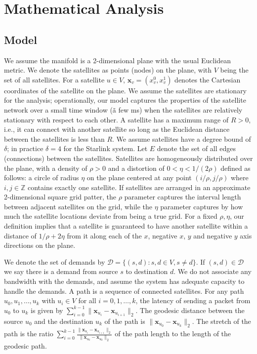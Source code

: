 \documentclass[acmsmall, screen]{acmart}
\begin{document}
\section{Mathematical Analysis}\label{appendix:analysis}
\subsection{Model}
We assume the manifold is a 2-dimensional plane with the usual Euclidean metric. 
We denote the satellites as points (nodes) on the plane, with $V$ being the set of all satellites. 
For a satellite $u \in V$, $\mathbf{x}_v = (x_v^0, x_v^1)$ denotes the Cartesian coordinates of the satellite on the plane. 
We assume the satellites are stationary for the analysis; operationally, our model captures the properties of the satellite network over a small time window (\~ a few ms) when the satellites are relatively stationary with respect to each other. 
A satellite has a maximum range of $R > 0$, i.e., it can connect with another satellite so long as the Euclidean distance between the satellites is less than $R$. 
We assume satellites have a degree bound of $\delta$; in practice $\delta = 4$ for the Starlink system. 
Let $E$ denote the set of all edges (connections) between the satellites. 
Satellites are homogeneously distributed over the plane, with a density of $\rho > 0$ and a distortion of $0 < \eta < 1/(2\rho)$ defined as follows:  
a circle of radius $\eta$ on the plane centered at any point $(i/\rho, j/\rho)$ where $i, j \in \mathbb{Z}$ contains exactly one satellite. 
If satellites are arranged in an approximate 2-dimensional square grid patter, the $\rho$ parameter captures the interval length between adjacent satellites on the grid, while the $\eta$ parameter captures by how much the satellite locations deviate from being a true grid. 
For a fixed $\rho, \eta$, our definition implies that a satellite is guaranteed to have another satellite within a distance of $1/\rho + 2\eta $ from it along each of the $x$, negative $x$, $y$ and negative $y$ axis directions on the plane. 

We denote the set of demands by $\mathcal{D} = \{ (s, d): s, d \in V, s \neq d \}$. 
If $(s, d) \in \mathcal{D}$ we say there is a demand from source $s$ to destination $d$. 
We do not associate any bandwidth with the demands, and assume the system has adequate capacity to handle the demands. 
A path is a sequence of connected satellites. 
For any path $u_0, u_1, \ldots, u_k$ with $u_i \in V$ for all $i = 0, 1, \ldots, k$, the latency of sending a packet from $u_0$ to $u_k$ is given by $\sum_{i=0}^{k-1} \| \mathbf{x}_{u_i} - \mathbf{x}_{u_{i+1}} \|_2$.  
The geodesic distance between the source $u_0$ and the destination $u_k$ of the path is $\| \mathbf{x}_{u_0} - \mathbf{x}_{u_k} \|_2$. 
The stretch of the path is the ratio $\sum_{i=0}^{k-1} \frac{\| \mathbf{x}_{u_i} - \mathbf{x}_{u_{i+1}} \|_2}{\| \mathbf{x}_{u_0} - \mathbf{x}_{u_k} \|_2}$ of the path length to the length of the geodesic path. 
\end{document}
